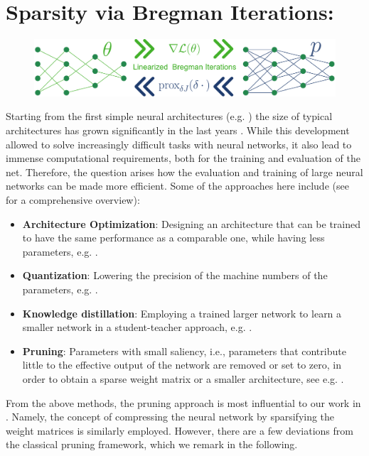 \section{Sparsity via Bregman Iterations: \cite{bungert2022bregman}}\label{sec:BREG}
%
\begin{figure}
	\centering
	\includegraphics[width=.5\textwidth]{atelier/Breg_dist/BregmanPosterCartoon.pdf}
\end{figure}
%
%
Starting from the first simple neural architectures (e.g. \cite{rosenblatt1958perceptron}) the size of typical architectures has grown significantly in the last years \cite{hoefler2021sparsity}. While this development allowed to solve increasingly difficult tasks with neural networks, it also lead to immense computational requirements, both for the training and evaluation of the net. Therefore, the question arises how the evaluation and training of large neural networks can be made more efficient. Some of the approaches here include (see \cite{gholami2021survey} for a comprehensive overview):
%
\begin{itemize}
	\item \textbf{Architecture Optimization}: Designing an architecture that can be trained to have the same performance as a comparable one, while having less parameters, e.g. \cite{elsken2019neural, howard2017mobilenets}.
	\item \textbf{Quantization}: Lowering the precision of the machine numbers of the parameters, e.g. \cite{banner2018scalable, courbariaux2014training}.
	\item \textbf{Knowledge distillation}: Employing a trained larger network to learn a smaller network in a student-teacher approach, e.g. \cite{schmidhuber1992learning, hinton2015distilling}.
	\item \textbf{Pruning}: Parameters with small saliency, i.e., parameters that contribute little to the effective output of the network are removed or set to zero, in order to obtain a sparse weight matrix or a smaller architecture, see e.g. \cite{lecun1989optimal, hassibi1993optimal}.
\end{itemize}
%
%
From the above methods, the pruning approach is most influential to our work in \cite{bungert2022bregman}. Namely, the concept of compressing the neural network by sparsifying the weight matrices is similarly employed. However, there are a few deviations from the classical pruning framework, which we remark in the following.

